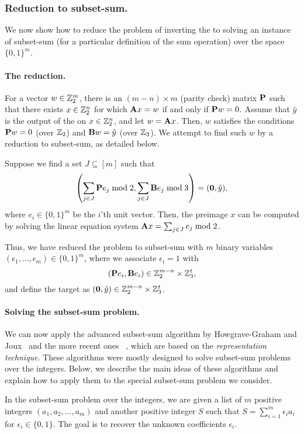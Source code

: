 \subsubsection{Reduction to subset-sum.}

We now show how to reduce the problem of inverting the \ttOWF to solving an instance of subset-sum (for a particular definition of the sum operation) over the space $\{0,1\}^m$.

\paragraph{The reduction.}
For a vector $w \in \mathbb{Z}_2^m$, there is an $(m -n) \times m$ (parity check) matrix $\mat{P}$ such that there exists $x \in \mathbb{Z}_2^n$ for which $\mat{A}x = w$ if and only if $\mat{P} w=0$.
Assume that $\hat{y}$ is the output of the \ttOWF on $x \in \mathbb{Z}_2^n$, and let $w = \mat{A}x$. Then,
$w$ satisfies the conditions $\mat{P} w = 0$ (over $\mathbb{Z}_2$) and $\mat{B}w = \hat{y}$ (over $\mathbb{Z}_3$).
We attempt to find such $w$ by a reduction to subset-sum, as detailed below.

Suppose we find a set $J \subseteq [m]$ such that
$$\left( \sum_{j \in J} \mat{P}e_j  \bmod 2, \sum_{j \in J} \mat{B}e_j  \bmod 3 \right) = (\vec{0},\hat{y}),$$
where $e_i \in \{0,1\}^m$ be the $i$'th unit vector.
Then, the preimage $x$ can be computed by solving the linear equation system
$\mat{A}x = \sum_{j \in J} e_j  \bmod 2$.

Thus, we have reduced the problem to subset-sum with $m$ binary variables
$(\epsilon_1, \ldots, \epsilon_m) \in \{0,1\}^m$, where we associate $\epsilon_i = 1$
with $$(\mat{P}e_i, \mat{B}e_i) \in \Z_2^{m-n} \times \Z_3^t,$$
and define the target
as $(\vec{0},\hat{y}) \in \Z_2^{m-n} \times \Z_3^t$.


\paragraph{Solving the subset-sum problem.}
We can now apply the advanced subset-sum algorithm by
Howgrave{-}Graham and Joux~\cite{Howgrave-GrahamJ10} and the more recent ones
~\cite{BeckerCJ11,BonnetainBSS20},
which are based on the \emph{representation technique}.
These algorithms were mostly designed to solve subset-sum problems over the integers.
Below, we describe the main ideas of these algorithms
and explain how to apply them to the special subset-sum problem
we consider.

In the subset-sum problem over the integers,
we are given a list of $m$ positive  integers $(a_1,a_2,\ldots,a_m)$
and another positive integer $S$ such that $S = \sum_{i=1}^{m} \epsilon_i a_i$
for $\epsilon_i \in \{0,1\}$. The goal is to recover the unknown coefficients $\epsilon_i$.

